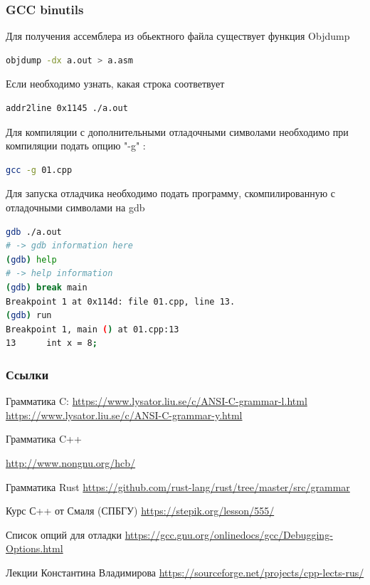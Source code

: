 \documentclass[10pt,fullscreen=true, bookmarks=false]{beamer}
\begin{document}
\begin{frame}[fragile]
\frametitle{GCC binutils}

Для получения ассемблера из обьектного файла существует функция Objdump
\begin{lstlisting}[language=bash]
objdump -dx a.out > a.asm
\end{lstlisting}

Если необходимо узнать, какая строка соответвует 
\begin{lstlisting}[language=bash]
addr2line 0x1145 ./a.out
\end{lstlisting}

Для компиляции с дополнительными отладочными символами необходимо при компиляции подать опцию "-g" :
\begin{lstlisting}[language=bash]
gcc -g 01.cpp
\end{lstlisting}

Для запуска отладчика необходимо подать программу, скомпилированную с отладочными символами на gdb

\begin{lstlisting}[language=bash]
gdb ./a.out
# -> gdb information here
(gdb) help
# -> help information
(gdb) break main
Breakpoint 1 at 0x114d: file 01.cpp, line 13.
(gdb) run
Breakpoint 1, main () at 01.cpp:13
13		int x = 8;
\end{lstlisting}

\tableofcontents[pausesections]
\end{frame}


\begin{frame}[fragile]
\frametitle{Ссылки}

Грамматика C:
\url{https://www.lysator.liu.se/c/ANSI-C-grammar-l.html}
\url{https://www.lysator.liu.se/c/ANSI-C-grammar-y.html}

Грамматика C++

\url{http://www.nongnu.org/hcb/}

Грамматика Rust
\url{https://github.com/rust-lang/rust/tree/master/src/grammar}

Курс С++ от Смаля (СПБГУ)
\url{https://stepik.org/lesson/555/}

Список опций для отладки
\url{https://gcc.gnu.org/onlinedocs/gcc/Debugging-Options.html}


Лекции Константина Владимирова 
\url{https://sourceforge.net/projects/cpp-lects-rus/}

\tableofcontents[pausesections]
\end{frame}
\end{document}
